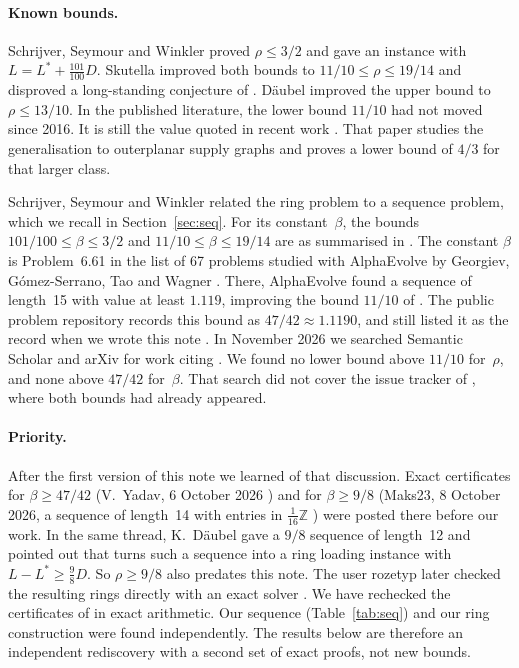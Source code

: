 \documentclass[11pt]{article}
\theoremstyle{plain}
\theoremstyle{definition}
\theoremstyle{remark}
\begin{document}
\paragraph{Known bounds.}
Schrijver, Seymour and Winkler \cite{SSW98} proved $\rho\le 3/2$ and gave an instance with $L=L^*+\tfrac{101}{100}D$.
Skutella \cite{Sku16} improved both bounds to $11/10\le\rho\le 19/14$ and disproved a long-standing conjecture of \cite{SSW98}.
Däubel \cite{Dau22} improved the upper bound to $\rho\le 13/10$.
In the published literature, the lower bound $11/10$ had not moved since 2016.
It is still the value quoted in recent work \cite{AS26}.
That paper studies the generalisation to outerplanar supply graphs and proves a lower bound of $4/3$ for that larger class.

Schrijver, Seymour and Winkler related the ring problem to a sequence problem, which we recall in Section~\ref{sec:seq}. For its constant~$\beta$, the bounds $101/100\le\beta\le3/2$ \cite{SSW98} and $11/10\le\beta\le19/14$ \cite{Sku16} are as summarised in \cite{GGTW25}.
The constant $\beta$ is Problem~6.61 in the list of 67 problems studied with AlphaEvolve by Georgiev, Gómez-Serrano, Tao and Wagner \cite{GGTW25}.
There, AlphaEvolve found a sequence of length~15 with value at least $1.119$, improving the bound $11/10$ of \cite{Sku16}.
The public problem repository records this bound as $47/42\approx1.1190$, and still listed it as the record when we wrote this note \cite{AERepo}.
In November 2026 we searched Semantic Scholar and arXiv for work citing \cite{SSW98,Sku16,Dau22,GGTW25}. We found no lower bound above $11/10$ for~$\rho$, and none above $47/42$ for~$\beta$.
That search did not cover the issue tracker of \cite{AERepo}, where both bounds had already appeared.

\paragraph{Priority.}
After the first version of this note we learned of that discussion. Exact certificates for $\beta\ge47/42$ (V.~Yadav, 6 October 2026 \cite{Yad26}) and for $\beta\ge9/8$ (Maks23, 8 October 2026, a sequence of length~14 with entries in $\tfrac1{16}\mathbb{Z}$ \cite{Mak26}) were posted there before our work.
In the same thread, K.~Däubel gave a $9/8$ sequence of length~12 and pointed out that \cite[Lemma~7]{Dau22} turns such a sequence into a ring loading instance with $L-L^*\ge\tfrac98 D$. So $\rho\ge9/8$ also predates this note. The user rozetyp later checked the resulting rings directly with an exact solver \cite{Roz26}.
We have rechecked the certificates of \cite{Mak26} in exact arithmetic.
Our sequence (Table~\ref{tab:seq}) and our ring construction were found independently. The results below are therefore an independent rediscovery with a second set of exact proofs, not new bounds.
\end{document}
